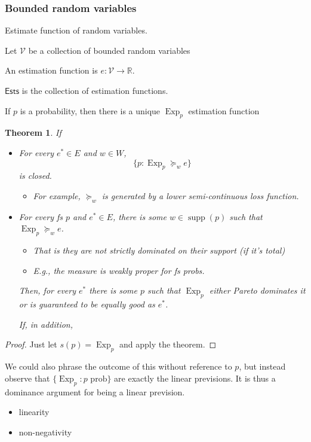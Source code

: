 \documentclass[11pt]{article}
\newtheorem{theorem}{Theorem}[section]
\theoremstyle{definition}
\theoremstyle{remark}
\newcommand{\R}{\mathbb R}
\newcommand{\supp}{\operatorname{supp}}
\newcommand{\Exp}{\operatorname{Exp}}
\begin{document}
\subsubsection{Bounded random variables}
Estimate function of random variables. 

Let $\mathcal{V}$ be a collection of bounded random variables

An estimation function is $e:\mathcal{V}\to \R$. 

\newcommand{\Ests}{\mathsf{Ests}}
$\Ests$ is the collection of estimation functions. 

If $p$ is a probability, then there is a unique  $\Exp_p$ estimation function

\begin{theorem}
	If 
	\begin{itemize}
		\item 
		For every $e^*\in E$ and $w\in W$, \[\{p\colon\Exp_p \succeq_w e\}\] is closed.
		\begin{itemize}
			\item For example, $\succeq_w$ is generated by a lower semi-continuous loss function. 
		\end{itemize}
		\item For every fs $p$ and $e^*\in E$, there is some $w\in\supp(p)$ such that $\Exp_p\succeq_w e$. 
		\begin{itemize}
			\item That is they are not strictly dominated on their support (if it's total)
			\item E.g., the measure is weakly proper for fs probs. 
		\end{itemize}
		Then, for every $e^*$ there is some $p$ such that $\Exp_p$ either Pareto dominates it or is guaranteed to be equally good as $e^*$. 
		
		If, in addition, 
	\end{itemize}
\end{theorem}
\begin{proof}
	Just let $s(p)=\Exp_p$ and apply the theorem. 	
\end{proof}
We could also phrase the outcome of this without reference to $p$, but instead observe that $\{\Exp_p : p\text{ prob}\}$ are exactly the linear previsions. It is thus a dominance argument for being a linear prevision. 
\begin{itemize}
	\item linearity
	\item non-negativity
\end{itemize}
\end{document}
